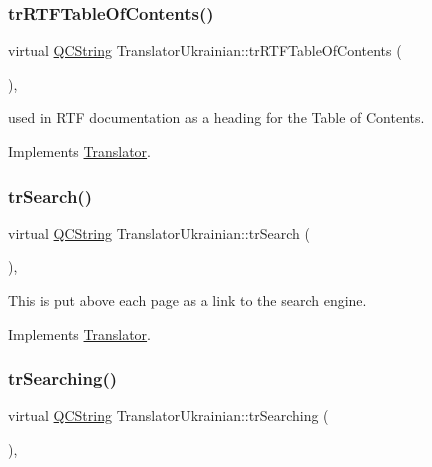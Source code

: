 \subsubsection{\texorpdfstring{trRTFTableOfContents()}{trRTFTableOfContents()}}
{\footnotesize\ttfamily virtual \mbox{\hyperlink{class_q_c_string}{Q\+C\+String}} Translator\+Ukrainian\+::tr\+R\+T\+F\+Table\+Of\+Contents (\begin{DoxyParamCaption}{ }\end{DoxyParamCaption})\hspace{0.3cm}{\ttfamily [inline]}, {\ttfamily [virtual]}}

used in R\+TF documentation as a heading for the Table of Contents. 

Implements \mbox{\hyperlink{class_translator}{Translator}}.

\mbox{\label{class_translator_ukrainian_ac2681fb7a797e296014de7892acb9369}} 
\subsubsection{\texorpdfstring{trSearch()}{trSearch()}}
{\footnotesize\ttfamily virtual \mbox{\hyperlink{class_q_c_string}{Q\+C\+String}} Translator\+Ukrainian\+::tr\+Search (\begin{DoxyParamCaption}{ }\end{DoxyParamCaption})\hspace{0.3cm}{\ttfamily [inline]}, {\ttfamily [virtual]}}

This is put above each page as a link to the search engine. 

Implements \mbox{\hyperlink{class_translator}{Translator}}.

\mbox{\label{class_translator_ukrainian_a7c34cbd42b8cee197628834b085ecf5c}} 
\subsubsection{\texorpdfstring{trSearching()}{trSearching()}}
{\footnotesize\ttfamily virtual \mbox{\hyperlink{class_q_c_string}{Q\+C\+String}} Translator\+Ukrainian\+::tr\+Searching (\begin{DoxyParamCaption}{ }\end{DoxyParamCaption})\hspace{0.3cm}{\ttfamily [inline]}, {\ttfamily [virtual]}}

